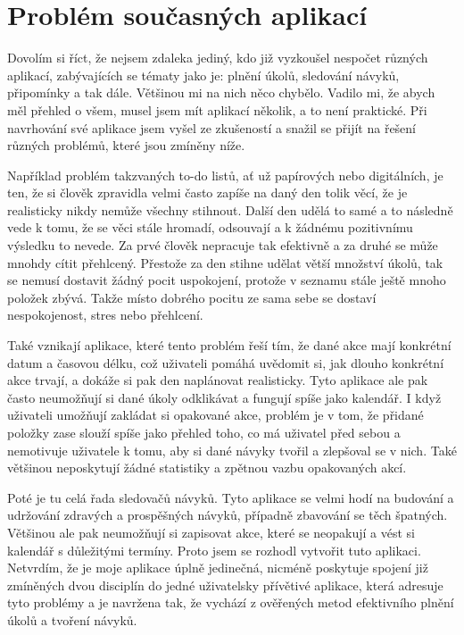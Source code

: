 \section{Problém současných aplikací}
\hspace{14pt} Dovolím si říct, že nejsem zdaleka jediný, kdo již vyzkoušel nespočet různých aplikací, zabývajících se tématy jako je: plnění úkolů, sledování návyků, připomínky a tak dále. Většinou mi na nich něco chybělo. Vadilo mi, že abych měl přehled o všem, musel jsem mít aplikací několik, a to není praktické. Při navrhování své aplikace jsem vyšel ze zkušeností a snažil se přijít na řešení různých problémů, které jsou zmíněny níže.

Například problém takzvaných to-do listů, ať už papírových nebo digitálních, je ten, že si člověk zpravidla velmi často zapíše na daný den tolik věcí, že je realisticky nikdy nemůže všechny stihnout. Další den udělá to samé a to následně vede k tomu, že se věci stále hromadí, odsouvají a k žádnému pozitivnímu výsledku to nevede. Za prvé člověk nepracuje tak efektivně a za druhé se může mnohdy cítit přehlcený. Přestože za den stihne udělat větší množství úkolů, tak se nemusí dostavit žádný pocit uspokojení, protože v seznamu stále ještě mnoho položek zbývá. Takže místo dobrého pocitu ze sama sebe se dostaví nespokojenost, stres nebo přehlcení.

Také vznikají aplikace, které tento problém řeší tím, že dané akce mají konkrétní datum a časovou délku, což uživateli pomáhá uvědomit si, jak dlouho konkrétní akce trvají, a dokáže si pak den naplánovat realisticky. Tyto aplikace ale pak často neumožňují si dané úkoly odklikávat a fungují spíše jako kalendář. I když uživateli umožňují zakládat si opakované akce, problém je v tom, že přidané položky zase slouží spíše jako přehled toho, co má uživatel před sebou a nemotivuje uživatele k tomu, aby si dané návyky tvořil a zlepšoval se v nich. Také většinou neposkytují žádné statistiky a zpětnou vazbu opakovaných akcí.

Poté je tu celá řada sledovačů návyků. Tyto aplikace se velmi hodí na budování a udržování zdravých a prospěšných návyků, případně zbavování se těch špatných. Většinou ale pak neumožňují si zapisovat akce, které se neopakují a vést si kalendář s důležitými termíny. 
\newpage
Proto jsem se rozhodl vytvořit tuto aplikaci. Netvrdím, že je moje aplikace úplně jedinečná, nicméně poskytuje spojení již zmíněných dvou disciplín do jedné uživatelsky přívětivé aplikace, která adresuje tyto problémy a je navržena tak, že vychází z ověřených metod efektivního plnění úkolů a tvoření návyků.

